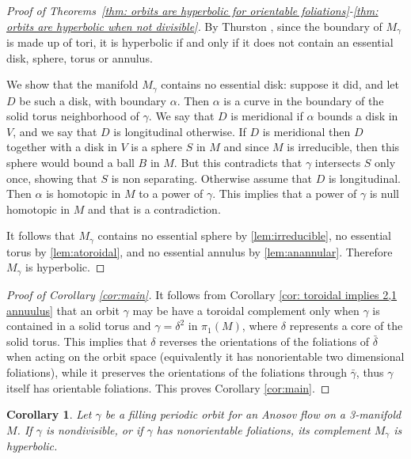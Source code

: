 \documentclass[12pt]{amsart}
\newtheorem{corollary}[theorem]{Corollary}
\theoremstyle{definition}
\theoremstyle{remark}
\newcommand{\mg}{M_\gamma}
\begin{document}
\begin{proof}[Proof of Theorems~\ref{thm: orbits are hyperbolic for orientable foliations}-\ref{thm: orbits are hyperbolic when not divisible}]

By Thurston \cite{ThurstonThreeDymensionalManifoldsKleinian}, since the boundary of $\mg$ is made up of tori, it is hyperbolic if and only if it does not contain an essential disk, sphere, torus or annulus.


We show that the manifold $\mg$ contains no essential  disk: suppose it did, and let $D$ be such a disk, with boundary $\alpha$. Then $\alpha$ is a
curve in the boundary of the solid torus neighborhood of $\gamma$.
We say that $D$ is meridional if $\alpha$ bounds a disk in $V$,
and we say that $D$ is longitudinal otherwise. If $D$ is meridional
then $D$ together with a disk in $V$ is a sphere $S$ in $M$ and since
$M$ is irreducible, then this sphere would bound a ball $B$ in $M$.
But this contradicts that $\gamma$ intersects $S$ only once,
showing that $S$ is non separating. Otherwise assume that
$D$ is longitudinal. Then $\alpha$ is homotopic in $M$ to a power
of $\gamma$. This implies that a power of $\gamma$ is null homotopic in $M$ and that is a contradiction.


It follows that $\mg$ contains no essential sphere by \ref{lem:irreducible}, no essential torus by \ref{lem:atoroidal}, and no essential annulus by \ref{lem:anannular}. Therefore $M_\gamma$ is 
hyperbolic.
\end{proof}


\begin{proof}[Proof of Corollary \ref{cor:main}]
It follows from Corollary \ref{cor: toroidal implies 2,1 annuulus} that an orbit $\gamma$ may be have a toroidal complement only when $\gamma$ is contained
in a solid torus and $\gamma = \delta^2$ in $\pi_1(M)$,
where $\delta$ represents a core of the solid torus.  This implies that $\delta$ reverses the orientations of the foliations of $\bar\delta$ when acting on the orbit space (equivalently it has nonorientable two dimensional foliations), while it preserves the orientations of the foliations through $\bar\gamma$, thus $\gamma$ itself has orientable foliations. This proves Corollary \ref{cor:main}.   
\end{proof}

\begin{corollary}\label{cor:nonorientable orbit is hyperbolic}
    Let $\gamma$ be a filling periodic orbit for an Anosov flow on a 3-manifold $M$. If $\gamma$ is nondivisible, or if $\gamma$ has nonorientable foliations, its complement  $\mg$ is hyperbolic.
\end{corollary} 
\end{document}

